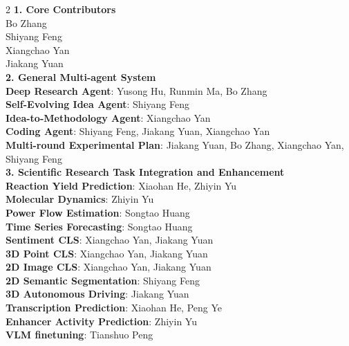 \documentclass{article}
\begin{document}
\begin{multicols}{2} %
\noindent
\textbf{\color{damaired} 1. Core Contributors} \\ [1.5mm]
\color{damaired} Bo Zhang \\  
\color{damaired} Shiyang Feng \\
\color{damaired} Xiangchao Yan \\
\color{damaired} Jiakang Yuan \\

\noindent
\textbf{\color{damaired} 2. General Multi-agent System} \\ [1.5mm]
\color{damaired} \textbf{Deep Research Agent}: Yusong Hu, Runmin Ma, Bo Zhang \\
\color{damaired} \textbf{Self-Evolving Idea Agent}: Shiyang Feng \\
\color{damaired} \textbf{Idea-to-Methodology Agent}: Xiangchao Yan \\
\color{damaired} \textbf{Coding Agent}: Shiyang Feng, Jiakang Yuan, Xiangchao Yan \\
\color{damaired} \textbf{Multi-round Experimental Plan}: Jiakang Yuan, Bo Zhang, Xiangchao Yan, Shiyang Feng \\

\noindent
\textbf{\color{damaired} 3. Scientific Research Task Integration and Enhancement} \\  [1.5mm]
\color{damaired} \textbf{Reaction Yield Prediction}: Xiaohan He, Zhiyin Yu\\
\color{damaired} \textbf{Molecular Dynamics}: Zhiyin Yu\\
\color{damaired} \textbf{Power
Flow Estimation}: Songtao Huang\\
\color{damaired} \textbf{Time Series Forecasting}: Songtao Huang\\
\color{damaired} \textbf{Sentiment CLS}: Xiangchao Yan, Jiakang Yuan\\
\color{damaired} \textbf{3D Point CLS}: Xiangchao Yan, Jiakang Yuan\\
\color{damaired} \textbf{2D Image CLS}: Xiangchao Yan, Jiakang Yuan\\
\color{damaired} \textbf{2D Semantic Segmentation}: Shiyang Feng \\
\color{damaired} \textbf{3D Autonomous Driving}: Jiakang Yuan \\
\color{damaired} \textbf{Transcription Prediction}: Xiaohan He, Peng Ye \\
\color{damaired} \textbf{Enhancer Activity Prediction}: Zhiyin Yu \\
\color{damaired} \textbf{VLM finetuning}: Tianshuo Peng \\



\end{multicols}
\end{document}
